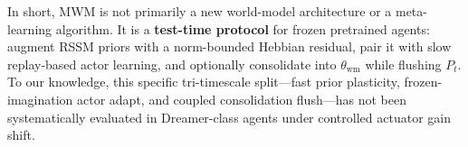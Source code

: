 In short, MWM is not primarily a new world-model architecture or a meta-learning algorithm.
It is a \textbf{test-time protocol} for frozen pretrained agents: augment RSSM priors with a norm-bounded Hebbian residual, pair it with slow replay-based actor learning, and optionally consolidate into $\theta_{\mathrm{wm}}$ while flushing $P_t$.
To our knowledge, this specific tri-timescale split---fast prior plasticity, frozen-imagination actor adapt, and coupled consolidation flush---has not been systematically evaluated in Dreamer-class agents under controlled actuator gain shift.
